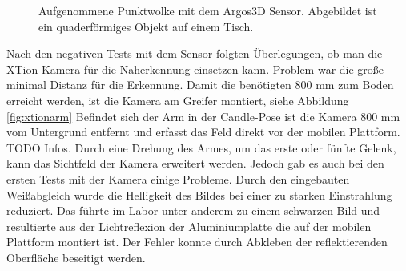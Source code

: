 \begin{figure}
{		\label{fig:argospowside}}
	\caption[Argos3D Punktwolke]{Aufgenommene Punktwolke mit dem Argos3D Sensor. Abgebildet ist ein quaderförmiges Objekt auf einem Tisch.}
	\label{fig:argos}
\end{figure}

Nach den negativen Tests mit dem Sensor folgten Überlegungen, ob man die XTion Kamera für die Naherkennung einsetzen kann. Problem war die große minimal Distanz für die Erkennung. Damit die benötigten 800 mm zum Boden erreicht werden, ist die Kamera am Greifer montiert, siehe Abbildung \ref{fig:xtionarm} Befindet sich der Arm in der Candle-Pose ist die Kamera 800 mm vom Untergrund entfernt und erfasst das Feld direkt vor der mobilen Plattform. TODO Infos. Durch eine Drehung des Armes, um das erste oder fünfte Gelenk, kann das Sichtfeld der Kamera erweitert werden. Jedoch gab es auch bei den ersten Tests mit der Kamera einige Probleme. Durch den eingebauten Weißabgleich wurde die Helligkeit des Bildes bei einer zu starken Einstrahlung reduziert. Das führte im Labor unter anderem zu einem schwarzen Bild und resultierte aus der Lichtreflexion der Aluminiumplatte die auf der mobilen Plattform montiert ist. Der Fehler konnte durch Abkleben der reflektierenden Oberfläche beseitigt werden.

